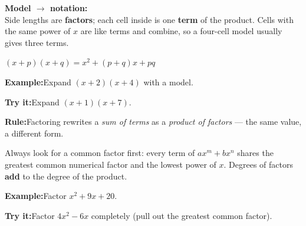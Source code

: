 \documentclass[12pt]{article}
\begin{document}

\begin{formulabox}\textbf{Model $\rightarrow$ notation:}\\[2pt]
Side lengths are \textbf{factors}; each cell inside is one \textbf{term} of
the product. Cells with the same power of $x$ are like terms and combine, so a
four-cell model usually gives three terms.\par
$(x + p)(x + q) = x^2 + (p + q)x + pq$
\end{formulabox}
\begin{examplebox}\textbf{Example:}\quad Expand $(x + 2)(x + 4)$ with a model.
\end{examplebox}
\begin{tryitbox}\textbf{Try it:}\quad Expand $(x + 1)(x + 7)$.\\[2pt]
\end{tryitbox}

\begin{formulabox}\textbf{Rule:}\quad Factoring rewrites a \emph{sum of terms}
as a \emph{product of factors} --- the same value, a different form.\par
Always look for a common factor first: every term of $ax^m + bx^n$ shares the
greatest common numerical factor and the lowest power of $x$. Degrees of
factors \textbf{add} to the degree of the product.
\end{formulabox}
\begin{examplebox}\textbf{Example:}\quad Factor $x^2 + 9x + 20$.
\end{examplebox}
\begin{tryitbox}\textbf{Try it:}\quad Factor $4x^2 - 6x$ completely (pull out
the greatest common factor).\\[2pt]
\end{tryitbox}
\end{document}
